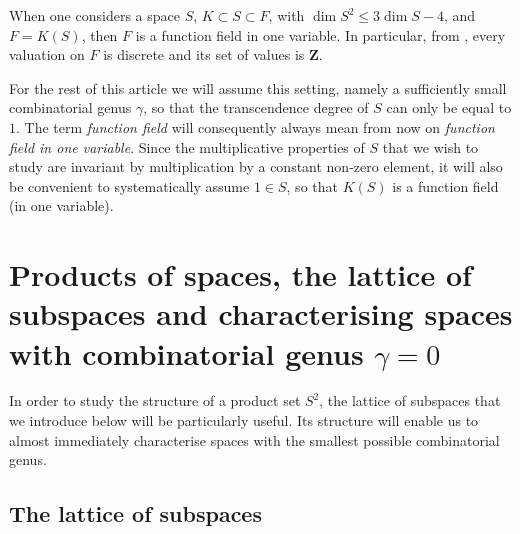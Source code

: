 \documentclass{article}
\theoremstyle{plain}
\theoremstyle{definition}
\theoremstyle{remark}
\newtheorem{rema}[thm]{Remark}
\def\Z{{\mathbf Z}}
\newcommand{\F}{\mathbf{F}}
\renewcommand{\leq}{\leqslant}
\begin{document}


 When one considers a space $S$, $K\subset
S \subset F$,
with $\dim S^2 \leq 3\dim S - 4$, and $F = K(S)$, then $F$ is a
function field in one variable. In particular,
from  \cite[Theorem 1.1.16]{Stichtenoth}, every valuation on $F$
is discrete and its set of  values is $\Z$.

\medskip

For the rest of this article we will assume this setting, namely a
sufficiently small combinatorial genus $\gamma$, so that the
transcendence degree of $S$ can only be equal to $1$. 
The term {\em function field} will consequently always 
mean from now on {\em function field in one variable}.
Since the multiplicative properties of $S$ that we wish to study are
invariant by multiplication by a constant non-zero element, it will
also be convenient to systematically assume $1\in S$, so that $K(S)$
is a function field (in one variable). 


\section{Products of spaces, the lattice of subspaces and
  characterising spaces with combinatorial genus $\gamma=0$}
\label{sec:products}


In order to study the structure of a
product set $S^2$, the lattice of subspaces that we introduce below
will be particularly useful.  Its structure will enable us to almost
immediately characterise spaces with the smallest possible
combinatorial genus.

\subsection{The lattice of subspaces}\label{sec:lattice}
\end{document}
